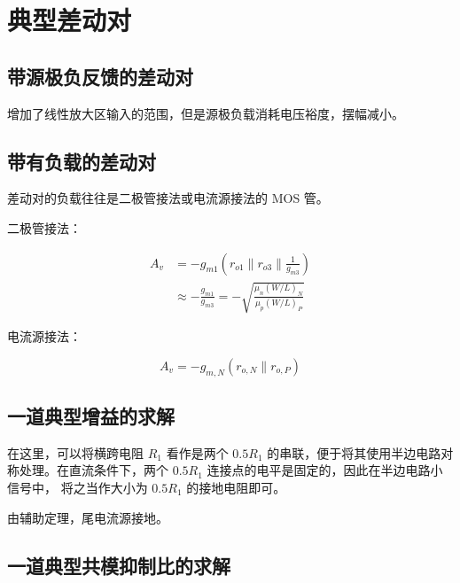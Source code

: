 \documentclass[cn,11pt,chinese,black,simple]{../elegantbook}
\begin{document}
\section{典型差动对}

\subsection{带源极负反馈的差动对}

增加了线性放大区输入的范围，但是源极负载消耗电压裕度，摆幅减小。


\subsection{带有负载的差动对}

差动对的负载往往是二极管接法或电流源接法的 MOS 管。

二极管接法：

\begin{equation*}
    \begin{aligned}
        A_v &= - g_{m1} \left(r_{o1} \| r_{o3} \| \frac{1}{g_{m3}}\right)
        \\& \approx - \frac{g_{m1}}{g_{m3}} = - \sqrt{\frac{\mu_n(W/L)_N}{\mu_p(W/L)_P}}
    \end{aligned}
\end{equation*}

电流源接法：

\[A_v = -g_{m,N} (r_{o,N} \| r_{o,P}) \]





\subsection{一道典型增益的求解}

在这里，可以将横跨电阻 \(R_1\) 看作是两个 \( 0.5R_1\) 的串联，便于将其使用半边电路对称处理。在直流条件下，两个 \( 0.5R_1\) 连接点的电平是固定的，因此在半边电路小信号中， 将之当作大小为 \( 0.5R_1\) 的接地电阻即可。

由辅助定理，尾电流源接地。



\subsection{一道典型共模抑制比的求解}
\end{document}
